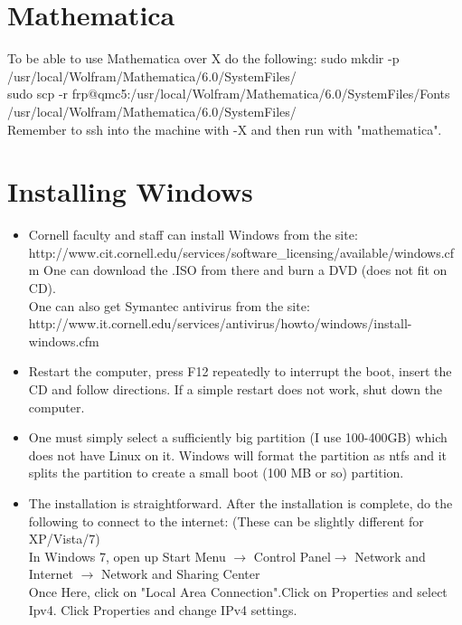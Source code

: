 \documentclass[12pt]{article}
\begin{document}
\section{Mathematica}
To be able to use Mathematica over X do the following:
sudo mkdir -p /usr/local/Wolfram/Mathematica/6.0/SystemFiles/ \\
sudo scp -r frp@qmc5:/usr/local/Wolfram/Mathematica/6.0/SystemFiles/Fonts /usr/local/Wolfram/Mathematica/6.0/SystemFiles/ \\
Remember to ssh into the machine with -X and then run with "mathematica".


\section{Installing Windows}
\begin{itemize}
\item Cornell faculty and staff can install Windows from the site:\\
      http://www.cit.cornell.edu/services/software\_licensing/available/windows.cfm
      One can download the .ISO from there and burn a DVD (does not fit on CD).\\
      One can also get Symantec antivirus from the site:\\
      http://www.it.cornell.edu/services/antivirus/howto/windows/install-windows.cfm
\item Restart the computer, press F12 repeatedly to interrupt the boot, insert the CD and follow directions. If a simple restart does not work, shut down the computer.
\item One must simply select a sufficiently big partition (I use 100-400GB) which does not have Linux on it. Windows will format the partition as ntfs and it splits the partition to create a small boot (100 MB or so) partition.
\item The installation is straightforward. After the installation is complete, do the following to connect to the internet: (These can be slightly different for XP/Vista/7)\\
      In Windows 7, open up Start Menu $\rightarrow$ Control Panel$\rightarrow$ Network and Internet $\rightarrow$ Network and Sharing Center \\
      Once Here, click on "Local Area Connection".Click on Properties and select Ipv4. Click Properties and change IPv4 settings.  \\

\end{itemize}
\end{document}
